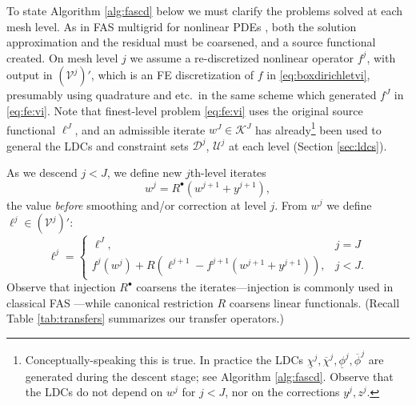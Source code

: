 \documentclass[letterpaper,final,12pt,reqno]{amsart}
\theoremstyle{cstyle}
\theoremstyle{cstyle*}
\theoremstyle{dstyle}
\numberwithin{equation}{section}
\numberwithin{figure}{section}
\numberwithin{table}{section}
\numberwithin{theorem}{section}
\newcommand{\cV}{\mathcal{V}}
\newcommand{\iR}{R^{\bullet}}
\newcommand{\fascd}{\pr{fascd}\xspace}
\begin{document}
To state \fascd Algorithm \ref{alg:fascd} below we must clarify the problems solved at each mesh level.  As in FAS multigrid for nonlinear PDEs \cite{BrandtLivne2011,Bruneetal2015,Trottenbergetal2001}, both the solution approximation and the residual must be coarsened, and a source functional created.  On mesh level $j$ we assume a re-discretized nonlinear operator $f^j$, with output in $(\cV^j)'$, which is an FE discretization of $f$ in \eqref{eq:boxdirichletvi}, presumably using quadrature and etc.~in the same scheme which generated $f^J$ in \eqref{eq:fe:vi}.  Note that finest-level problem \eqref{eq:fe:vi} uses the original source functional $\ell^J$, and an admissible iterate $w^J \in \mathcal{K}^J$ has already\footnote{Conceptually-speaking this is true.  In practice the LDCs $\underline{\chi}^j,\overline{\chi}^j,\underline{\phi}^j,\overline{\phi}^j$ are generated during the descent stage; see Algorithm \ref{alg:fascd}.  Observe that the LDCs do not depend on $w^j$ for $j<J$, nor on the corrections $y^j,z^j$.} been used to general the LDCs and constraint sets $\mathcal{D}^j$, $\mathcal{U}^j$ at each level (Section \ref{sec:ldcs}).

As we descend $j<J$, we define new $j$th-level iterates
\begin{equation}
w^j = \iR(w^{j+1} + y^{j+1}),  \label{eq:fe:definew}
\end{equation}
the value \emph{before} smoothing and/or correction at level $j$.  From $w^j$ we define $\ell^j \in (\cV^j)'$:
\begin{equation}
\ell^j = \begin{cases} \ell^J, & j=J \\
                       f^j(w^j) + R\left(\ell^{j+1}-f^{j+1}(w^{j+1}+y^{j+1})\right), & j<J. \end{cases} \label{eq:fe:levelsource}
\end{equation}
Observe that injection $\iR$ coarsens the iterates---injection is commonly used in classical FAS \cite[section 5.3]{Trottenbergetal2001}---while canonical restriction $R$ coarsens linear functionals.  (Recall Table \ref{tab:transfers} summarizes our transfer operators.)
\end{document}
